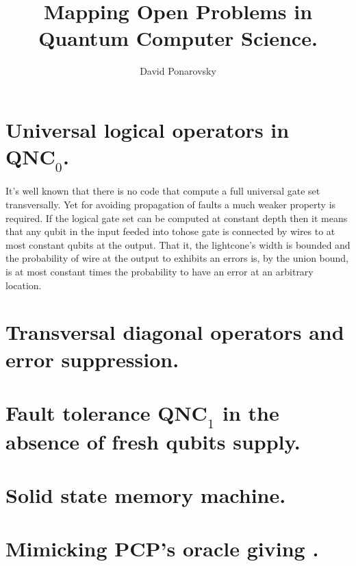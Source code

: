 \documentclass[manuscript,screen,review]{acmart}
\begin{document}

\title{ Mapping Open Problems in Quantum Computer Science.}
\author{David Ponarovsky}
\maketitle

\newcommand*{\Mbas}{\mathcal{X}^\prime}
\newcommand*{\bas}{\mathcal{X}}
\newcommand*{\sMbas}{\Mbas}
\newcommand*{\QQ}{C_{X}/C_{Z}^\perp }
\newcommand*{\trig}{ Triorthogonal }
\newcommand*{\Hyp}{ Hyperproduct }
\newcommand*{\Cin}{ C_{\text{initial}} }
\newcommand*{\Ctan}{ C_{\text{Tan}} }

\section{Universal logical operators in $\textbf{QNC}_{0}$.  }
It's well known that there is no code that compute a full universal gate set transversally. Yet for avoiding propagation of faults a much weaker property is required. If the logical gate set can be computed at constant depth then it means that any qubit in the input feeded into tohose gate is connected by wires to at most constant qubits at the output. That it, the lightcone's width is bounded and the probability of wire at the output to exhibits an errors is, by the union bound, is at most constant times the probability to have an error at an arbitrary location.
\section{Transversal diagonal operators and error suppression.  }
\section{Fault tolerance $\textbf{QNC}_{1}$ in the absence of fresh qubits supply.  }
\section{Solid state memory machine.}
\section{Mimicking PCP's oracle giving .}
\printbibliography
\end{document}
